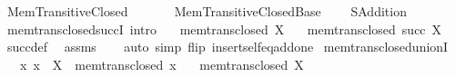 %
\begin{isabellebody}%
%
%
\isadelimtheory
%
\endisadelimtheory
%
\isatagtheory
\isanewline
{}\isamarkupfalse%
\ Mem{\isacharunderscore}{\kern0pt}Transitive{\isacharunderscore}{\kern0pt}Closed\isanewline
\ \ \isanewline
\ \ \ \ Mem{\isacharunderscore}{\kern0pt}Transitive{\isacharunderscore}{\kern0pt}Closed{\isacharunderscore}{\kern0pt}Base\isanewline
\ \ \ \ SAddition\isanewline
{}%
\endisatagtheory
{\isafoldtheory}%
%
\isadelimtheory
\isanewline
%
\endisadelimtheory
\isanewline
{}\isamarkupfalse%
\ mem{\isacharunderscore}{\kern0pt}trans{\isacharunderscore}{\kern0pt}closed{\isacharunderscore}{\kern0pt}succI\ {\isacharbrackleft}{\kern0pt}intro{\isacharbrackright}{\kern0pt}{\isacharcolon}{\kern0pt}\isanewline
\ \ \ {\isachardoublequoteopen}mem{\isacharunderscore}{\kern0pt}trans{\isacharunderscore}{\kern0pt}closed\ X{\isachardoublequoteclose}\isanewline
\ \ \ {\isachardoublequoteopen}mem{\isacharunderscore}{\kern0pt}trans{\isacharunderscore}{\kern0pt}closed\ {\isacharparenleft}{\kern0pt}succ\ X{\isacharparenright}{\kern0pt}{\isachardoublequoteclose}\isanewline
%
\isadelimproof
\ \ %
\endisadelimproof
%
\isatagproof
{}\isamarkupfalse%
\ succ{\isacharunderscore}{\kern0pt}def\ \isamarkupfalse%
\ assms\isanewline
\ \ \isamarkupfalse%
\ {\isacharparenleft}{\kern0pt}auto\ simp\ flip{\isacharcolon}{\kern0pt}\ insert{\isacharunderscore}{\kern0pt}self{\isacharunderscore}{\kern0pt}eq{\isacharunderscore}{\kern0pt}add{\isacharunderscore}{\kern0pt}one{\isacharparenright}{\kern0pt}%
\endisatagproof
{\isafoldproof}%
%
\isadelimproof
\isanewline
%
\endisadelimproof
\isanewline
{}\isamarkupfalse%
\ mem{\isacharunderscore}{\kern0pt}trans{\isacharunderscore}{\kern0pt}closed{\isacharunderscore}{\kern0pt}unionI{\isacharcolon}{\kern0pt}\isanewline
\ \ \ {\isachardoublequoteopen}{\isasymAnd}x{\isachardot}{\kern0pt}\ x\ {\isasymin}\ X\ {\isasymLongrightarrow}\ mem{\isacharunderscore}{\kern0pt}trans{\isacharunderscore}{\kern0pt}closed\ x{\isachardoublequoteclose}\isanewline
\ \ \ {\isachardoublequoteopen}mem{\isacharunderscore}{\kern0pt}trans{\isacharunderscore}{\kern0pt}closed\ {\isacharparenleft}{\kern0pt}{\isasymUnion}X{\isacharparenright}{\kern0pt}{\isachardoublequoteclose}\isanewline
%
\isadelimproof
\ \ %
\endisadelimproof
%
\isatagproof

\end{isabellebody}
